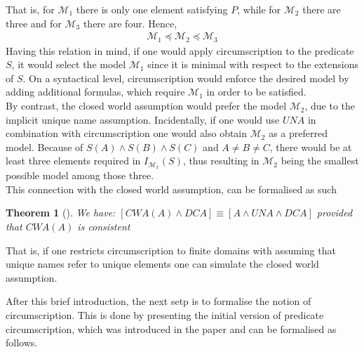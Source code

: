 \documentclass{article}
\newtheorem{thm}{Theorem}[section]
\begin{document}
That is, for $\mathcal{M}_1$ there is only one element satisfying $P$, while for $\mathcal{M}_2$ there are three and for $\mathcal{M}_3$ there are four. Hence, 
\begin{equation*}
\begin{split}
\mathcal{M}_1 \preceq \mathcal{M}_2 \preceq \mathcal{M}_3 
\end{split}
\end{equation*}
Having this relation in mind, if one would apply circumscription to the predicate $S$, it would select the model $\mathcal{M}_1$ since it is minimal with respect to the extensions of $S$. On a syntactical level, circumscription would enforce the desired model by adding additional formulas, which require $\mathcal{M}_1$ in order to be satisfied. \\
By contrast, the closed world assumption would prefer the model $\mathcal{M}_2$, due to the implicit unique name assumption. Incidentally, if one would use $UNA$ in combination with circumscription one would also obtain $\mathcal{M}_2$ as a preferred model. Because of  $S(A) \wedge S(B) \wedge S(C)$ and $A \neq B \neq C$, there would be at least three elements required in $I_{\mathcal{M}_x}(S)$, thus resulting in $\mathcal{M}_2$ being the smallest possible model among those three. \\
This connection with the closed world assumption, can be formalised as such
\begin{thm}[\cite{brewka1997nonmonotonic}]
We have: $[\textit{CWA}(A) \wedge \textit{DCA}] \equiv [A \wedge \textit{UNA} \wedge \textit{DCA}]$ provided that $\textit{CWA}(A)$ is consistent
\end{thm} 
That is, if one restricts circumscription to finite domains with assuming that unique names refer to unique elements one can simulate the closed world assumption.
\\
\linebreak

After this brief introduction, the next setp is to formalise the notion of circumscription. This is done by presenting the initial version of predicate circumscription, which was introduced in the paper \cite{mccarthy1981circumscription} and can be formalised as follows. \\
\end{document}
